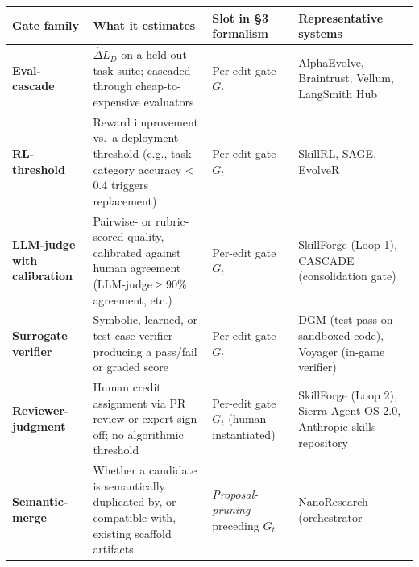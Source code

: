 \documentclass[
]{article}
\newcounter{none} %
\begin{document}
{\def\LTcaptype{none} %
\begin{longtable}[]{@{}
  >{\raggedright\arraybackslash}p{}
  >{\raggedright\arraybackslash}p{}
  >{\raggedright\arraybackslash}p{}
  >{\raggedright\arraybackslash}p{}@{}}
\toprule\noalign{}
\begin{minipage}[b]{\linewidth}\raggedright
Gate family
\end{minipage} & \begin{minipage}[b]{\linewidth}\raggedright
What it estimates
\end{minipage} & \begin{minipage}[b]{\linewidth}\raggedright
Slot in §3 formalism
\end{minipage} & \begin{minipage}[b]{\linewidth}\raggedright
Representative systems
\end{minipage} \\
\midrule\noalign{}
\endhead
\bottomrule\noalign{}
\endlastfoot
\textbf{Eval-cascade} & \(\widehat{\Delta} L_D\) on a held-out task
suite; cascaded through cheap-to-expensive evaluators & Per-edit gate
\(G_t\) & AlphaEvolve, Braintrust, Vellum, LangSmith Hub \\
\textbf{RL-threshold} & Reward improvement vs.~a deployment threshold
(e.g., task-category accuracy \textless{} 0.4 triggers replacement) &
Per-edit gate \(G_t\) & SkillRL, SAGE, EvolveR \\
\textbf{LLM-judge with calibration} & Pairwise- or rubric-scored
quality, calibrated against human agreement (LLM-judge ≥ 90\% agreement,
etc.) & Per-edit gate \(G_t\) & SkillForge (Loop 1), CASCADE
(consolidation gate) \\
\textbf{Surrogate verifier} & Symbolic, learned, or test-case verifier
producing a pass/fail or graded score & Per-edit gate \(G_t\) & DGM
(test-pass on sandboxed code), Voyager (in-game verifier) \\
\textbf{Reviewer-judgment} & Human credit assignment via PR review or
expert sign-off; no algorithmic threshold & Per-edit gate \(G_t\)
(human-instantiated) & SkillForge (Loop 2), Sierra Agent OS 2.0,
Anthropic skills repository \\
\textbf{Semantic-merge} & Whether a candidate is semantically duplicated
by, or compatible with, existing scaffold artifacts &
\emph{Proposal-pruning} preceding \(G_t\) & NanoResearch (orchestrator

\end{longtable}}
\end{document}
